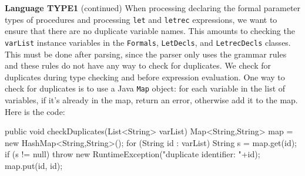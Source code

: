 \begin{minipage}[t]{\sw}
\slidenumber
\LARGE
{\bf Language TYPE1} (continued)\exx
When processing declaring the formal parameter types of procedures
and processing \verb'let' and \verb'letrec' expressions,
we want to ensure that there are no duplicate variable names.
This amounts to checking the \verb'varList' instance variables
in the \verb'Formals', \verb'LetDecls', and \verb'LetrecDecls' classes.
This must be done after parsing,
since the parser only uses the grammar rules
and these rules do not have any way to check for duplicates.
We check for duplicates during type checking
and before expression evaluation.\exx
One way to check for duplicates is to use a Java \verb'Map' object:
for each variable in the list of variables,
if it's already in the map, return an error,
otherwise add it to the map.
Here is the code:
\Large
\begin{qv}
public void checkDuplicates(List<String> varList) {
    Map<String,String> map = new HashMap<String,String>();
    for (String id : varList) {
        String s = map.get(id);
        if (s != null)
            throw new RuntimeException("duplicate identifier: "+id);
        map.put(id, id);
    }
}
\end{qv}
\end{minipage}

